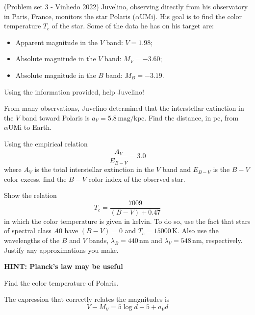 \documentclass[11pt]{article}
\begin{document}
\begin{pproblem}(Problem set 3 - Vinhedo 2022)
Juvelino, observing directly from his observatory in Paris, France, monitors the star Polaris ($\alpha\text{UMi}$). His goal is to find the color temperature $T_c$ of the star. Some of the data he has on his target are:

\begin{itemize}
    \item Apparent magnitude in the $V$ band: $V = 1.98$;
    \item Absolute magnitude in the $V$ band: $M_V = -3.60$;
    \item Absolute magnitude in the $B$ band: $M_B = -3.19$.
\end{itemize}

Using the information provided, help Juvelino!

\begin{alternativas}
    \item From many observations, Juvelino determined that the interstellar extinction in the $V$ band toward Polaris is $a_V = 5.8 \, \text{mag/kpc}$. Find the distance, in pc, from $\alpha\text{UMi}$ to Earth.
    \item Using the empirical relation
    \begin{equation}
        \frac{A_V}{E_{B-V}} = 3.0
    \end{equation}
    where $A_V$ is the total interstellar extinction in the $V$ band and $E_{B-V}$ is the $B-V$ color excess, find the $B-V$ color index of the observed star.
    \item Show the relation
    \begin{equation}
        T_c = \frac{7009}{(B-V) + 0.47}
    \end{equation}
    in which the color temperature is given in kelvin. To do so, use the fact that stars of spectral class $A0$ have $(B-V) = 0$ and $T_c = 15000 \, \text{K}$. Also use the wavelengths of the $B$ and $V$ bands, $\lambda_B = 440 \, \text{nm}$ and $\lambda_V = 548 \, \text{nm}$, respectively. Justify any approximations you make.

    \textbf{HINT: Planck's law may be useful}
    \item Find the color temperature of Polaris.
\end{alternativas}
\begin{pssolution*}{}{}
    \begin{alternativas}
        \item The expression that correctly relates the magnitudes is
        \[V - M_V = 5 \log d - 5 + a_V d\]


\end{alternativas}
\end{pssolution*}
\end{pproblem}
\end{document}
